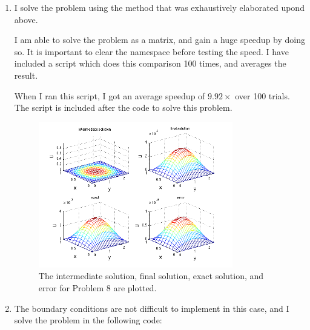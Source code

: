 \documentclass[11pt]{article}
\begin{document}
\begin{enumerate}
\item I solve the problem using the method that was exhaustively elaborated upond above.

I am able to solve the problem as a matrix, and gain a huge speedup by doing so.
It is important to clear the namespace before testing the speed.
I have included a script which does this comparison 100 times, and averages the result.

When I ran this script, I got an average speedup of $9.92 \times$ over 100 trials.
The script is included after the code to solve this problem.









\begin{figure}[h!]
  \centering
    \includegraphics[width=0.8\textwidth]{andy_hw15_prb08_all.png}
    \caption{The intermediate solution, final solution, exact solution, and error for Problem 8 are plotted.}
\end{figure}

\item The boundary conditions are not difficult to implement in this case, and I solve the problem in the following code:




\end{enumerate}
\end{document}
